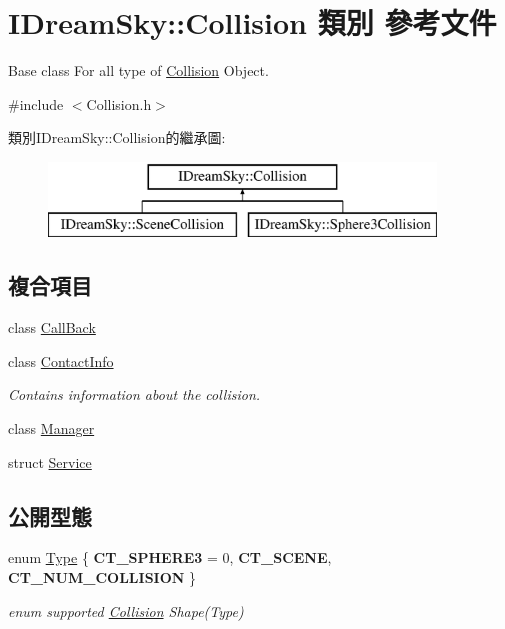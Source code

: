 \hypertarget{class_i_dream_sky_1_1_collision}{}\section{I\+Dream\+Sky\+:\+:Collision 類別 參考文件}
\label{class_i_dream_sky_1_1_collision}


Base class For all type of \hyperlink{class_i_dream_sky_1_1_collision}{Collision} Object.  




{\ttfamily \#include $<$Collision.\+h$>$}

類別\+I\+Dream\+Sky\+:\+:Collision的繼承圖\+:\begin{figure}[H]
\begin{center}
\leavevmode
\includegraphics[height=2.000000cm]{class_i_dream_sky_1_1_collision}
\end{center}
\end{figure}
\subsection*{複合項目}
\begin{DoxyCompactItemize}
\item 
class \hyperlink{class_i_dream_sky_1_1_collision_1_1_call_back}{Call\+Back}
\item 
class \hyperlink{class_i_dream_sky_1_1_collision_1_1_contact_info}{Contact\+Info}
\begin{DoxyCompactList}\small\item\em Contains information about the collision. \end{DoxyCompactList}\item 
class \hyperlink{class_i_dream_sky_1_1_collision_1_1_manager}{Manager}
\item 
struct \hyperlink{struct_i_dream_sky_1_1_collision_1_1_service}{Service}
\end{DoxyCompactItemize}
\subsection*{公開型態}
\begin{DoxyCompactItemize}
\item 
enum \hyperlink{class_i_dream_sky_1_1_collision_a6f78283a27aaf9e6cf2c8a174f0ce816}{Type} \{ {\bfseries C\+T\+\_\+\+S\+P\+H\+E\+R\+E3} = 0, 
{\bfseries C\+T\+\_\+\+S\+C\+E\+NE}, 
{\bfseries C\+T\+\_\+\+N\+U\+M\+\_\+\+C\+O\+L\+L\+I\+S\+I\+ON}
 \}\begin{DoxyCompactList}\small\item\em enum supported \hyperlink{class_i_dream_sky_1_1_collision}{Collision} Shape(\+Type) \end{DoxyCompactList}
\end{DoxyCompactItemize}
